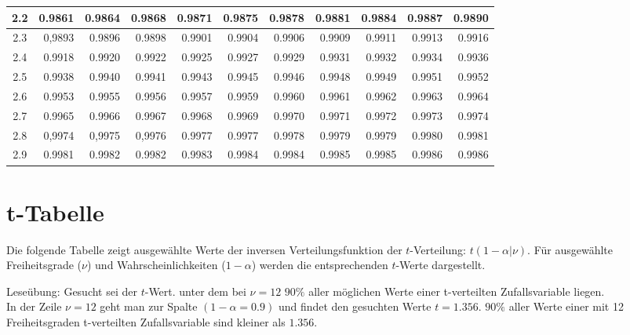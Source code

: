 \documentclass[11pt,a4paper]{article}
\begin{document}
\begin{table}[h]
\begin{tabular}{|c||r|r|r|r|r|r|r|r|r|r|}
		\hline
		2.2	& 0.9861	& 0.9864	& 0.9868	& 0.9871	& 0.9875	& 0.9878	& 0.9881	& 0.9884	& 0.9887	& 0.9890\\
		\hline
		2.3	& 0,9893	& 0.9896	& 0.9898	& 0.9901	& 0.9904	& 0.9906	& 0.9909	& 0.9911	& 0.9913	& 0.9916\\
		\hline
		2.4	& 0.9918	& 0.9920	& 0.9922	& 0.9925	& 0.9927	& 0.9929	& 0.9931	& 0.9932	& 0.9934	& 0.9936\\
		\hline
		2.5	& 0.9938	& 0.9940	& 0.9941	& 0.9943	& 0.9945	& 0.9946	& 0.9948	& 0.9949	& 0.9951	& 0.9952\\
		\hline
		2.6	& 0.9953	& 0.9955	& 0.9956	& 0.9957	& 0.9959	& 0.9960			& 0.9961	& 0.9962	& 0.9963	& 0.9964\\
		\hline
		2.7	& 0.9965	& 0.9966	& 0.9967	& 0.9968	& 0.9969	& 0.9970	& 0.9971	& 0.9972	& 0.9973	& 0.9974\\
		\hline
		2.8	& 0,9974	& 0,9975	& 0,9976	& 0.9977	& 0.9977	& 0.9978	& 0.9979	& 0.9979	& 0.9980	& 0.9981\\
		\hline
		2.9	& 0.9981	& 0.9982	& 0.9982	& 0.9983	& 0.9984	& 0.9984	& 0.9985	& 0.9985	& 0.9986	& 0.9986\\
		\hline
	\end{tabular}
\end{table}

\newpage

\section{t-Tabelle} 
Die folgende Tabelle zeigt ausgewählte Werte der inversen Verteilungsfunktion der $t$-Verteilung: $t(1-\alpha|\nu)$. Für ausgewählte Freiheitsgrade ($\nu$) und Wahrscheinlichkeiten ($1-\alpha$) werden die entsprechenden $t$-Werte dargestellt.

Leseübung: Gesucht sei der $t$-Wert. unter dem bei $\nu = 12$ $90\%$ aller möglichen Werte einer t-verteilten Zufallsvariable liegen. \\
In der Zeile $\nu=12$ geht man zur Spalte $(1-\alpha = 0.9)$ und findet den gesuchten Werte $t = 1.356$. $90\%$ aller Werte einer mit 12 Freiheitsgraden t-verteilten Zufallsvariable sind kleiner als $1.356$. 
\end{document}
